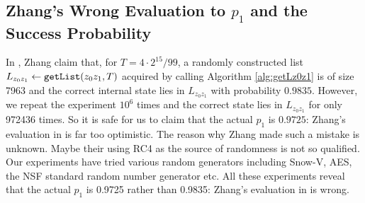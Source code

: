 \subsection{Zhang's Wrong Evaluation to $p_1$ and the Success Probability}\label{sec:ZhangWrongP1}
In \cite{AC:Zhang19}, Zhang \etal claim that, for $T=4\cdot 2^{15}/99$, a randomly constructed list $L_{z_0z_1}\leftarrow {\tt getList}(z_0z_1, T)$ acquired by calling Algorithm \ref{alg:getLz0z1} is of size 7963  and the correct internal state lies in $L_{z_0z_1}$ with probability $0.9835$.
However, we repeat the experiment $10^6$ times and the correct state lies in $L_{z_0z_1}$ for only 972436 times.
So it is safe for us to claim that the actual $p_1$ is $0.9725$: Zhang's evaluation in \cite{AC:Zhang19} is far too optimistic.
The reason why Zhang \etal made such a mistake is unknown. 
Maybe their using RC4 as the source of randomness is not so qualified.
Our experiments have tried various random generators including Snow-V, AES, the NSF standard random number generator etc.
All these experiments reveal that the actual $p_1$ is 0.9725 rather than 0.9835: Zhang's evaluation in \cite{AC:Zhang19} is wrong.

